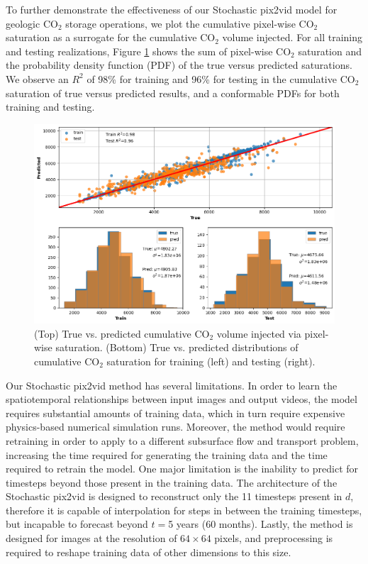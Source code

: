 \documentclass[10pt, twoside]{article}
\begin{document}
To further demonstrate the effectiveness of our Stochastic pix2vid model for geologic CO$_2$ storage operations, we plot the cumulative pixel-wise CO$_2$ saturation as a surrogate for the cumulative CO$_2$ volume injected. For all training and testing realizations, Figure \ref{co2_pvi} shows the sum of pixel-wise CO$_2$ saturation and the probability density function (PDF) of the true versus predicted saturations. We observe an $R^2$ of 98\% for training and 96\% for testing in the cumulative CO$_2$ saturation of true versus predicted results, and a conformable PDFs for both training and testing.

\begin{figure}
    \centering
    \includegraphics[width=\textwidth]{figures/co2_pvi.png}
    \caption{(Top) True vs. predicted cumulative CO$_2$ volume injected via pixel-wise saturation. (Bottom) True vs. predicted distributions of cumulative CO$_2$ saturation for training (left) and testing (right).}
    \label{co2_pvi}
\end{figure}

Our Stochastic pix2vid method has several limitations. In order to learn the spatiotemporal relationships between input images and output videos, the model requires substantial amounts of training data, which in turn require expensive physics-based numerical simulation runs. Moreover, the method would require retraining in order to apply to a different subsurface flow and transport problem, increasing the time required for generating the training data and the time required to retrain the model. One major limitation is the inability to predict for timesteps beyond those present in the training data. The architecture of the Stochastic pix2vid is designed to reconstruct only the 11 timesteps present in $d$, therefore it is capable of interpolation for steps in between the training timesteps, but incapable to forecast beyond $t=$5 years (60 months). Lastly, the method is designed for images at the resolution of $64\times64$ pixels, and preprocessing is required to reshape training data of other dimensions to this size.
\end{document}
